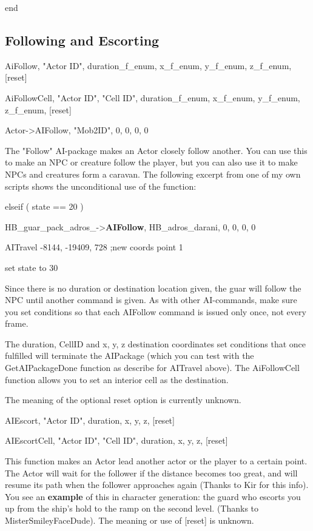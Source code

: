 \documentclass[
]{article}
\begin{document}
end

\hypertarget{following-and-escorting}{%
\subsection{Following and Escorting}\label{following-and-escorting}}

AiFollow, "Actor ID", duration\_f\_enum, x\_f\_enum, y\_f\_enum,
z\_f\_enum, {[}reset{]}

AiFollowCell, "Actor ID", "Cell ID", duration\_f\_enum, x\_f\_enum,
y\_f\_enum, z\_f\_enum, {[}reset{]}

Actor-\textgreater AIFollow, "Mob2ID", 0, 0, 0, 0

The "Follow" AI-package makes an Actor closely follow another. You can
use this to make an NPC or creature follow the player, but you can also
use it to make NPCs and creatures form a caravan. The following excerpt
from one of my own scripts shows the unconditional use of the function:

elseif ( state == 20 )

HB\_guar\_pack\_adros\_-\textgreater{}\textbf{AIFollow},
HB\_adros\_darani, 0, 0, 0, 0

AITravel -8144, -19409, 728 ;new coords point 1

set state to 30

Since there is no duration or destination location given, the guar will
follow the NPC until another command is given. As with other
AI-commands, make sure you set conditions so that each AIFollow command
is issued only once, not every frame.

The duration, CellID and x, y, z destination coordinates set conditions
that once fulfilled will terminate the AIPackage (which you can test
with the GetAIPackageDone function as describe for AITravel above). The
AiFollowCell function allows you to set an interior cell as the
destination.

The meaning of the optional reset option is currently unknown.

AIEscort, "Actor ID", duration, x, y, z, {[}reset{]}

AIEscortCell, "Actor ID", "Cell ID", duration, x, y, z, {[}reset{]}

This function makes an Actor lead another actor or the player to a
certain point. The Actor will wait for the follower if the distance
becomes too great, and will resume its path when the follower approaches
again (Thanks to Kir for this info). You see an \textbf{example} of this
in character generation: the guard who escorts you up from the ship's
hold to the ramp on the second level. (Thanks to MisterSmileyFaceDude).
The meaning or use of {[}reset{]} is unknown.
\end{document}
